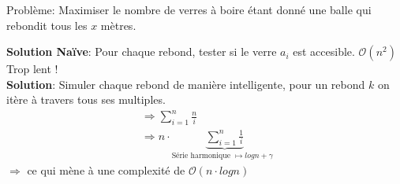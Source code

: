 \begin{frame}
    \frametitle{\problemtitle}
        \begin{block}
            {Problème:} Maximiser le nombre de verres à boire étant donné une balle qui rebondit tous les $x$ mètres.
        \end{block}
        \pause
        \textbf{Solution Naïve}: Pour chaque rebond, tester si le verre $a_i$ est accesible. $\mathcal O(n^2)$ Trop lent !\\
        \pause
        \textbf{Solution}: Simuler chaque rebond de manière intelligente, pour un rebond $k$ on itère à travers tous ses multiples. \\
        \pause
        \begin{align}
            &\Rightarrow \sum_{i=1}^{n} \frac{n}{i}\\
            &\Rightarrow n \cdot \underbrace{\sum_{i=1}^{n} \frac{1}{i}}_{\text{Série harmonique $\mapsto log n + \gamma$ }}
        \end{align}
        $\Rightarrow$ ce qui mène à une complexité de $\mathcal O(n \cdot log n)$

\end{frame}


